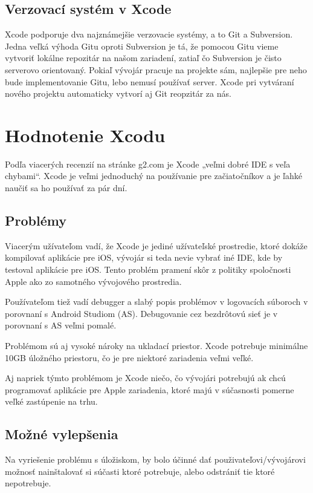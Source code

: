 \documentclass[12pt]{article}
\begin{document}
		\subsection{Verzovací systém v Xcode}
			Xcode podporuje dva najznámejšie verzovacie systémy,  a to Git a Subversion.  Jedna veľká výhoda Gitu oproti Subversion je tá,  že pomocou Gitu vieme vytvoriť lokálne repozitár na našom zariadení,  zatiaľ čo Subversion je čisto serverovo orientovaný.  Pokiaľ vývojár pracuje na projekte sám,  najlepšie pre neho bude implementovanie Gitu,  lebo nemusí používať server.  Xcode pri vytváraní nového projektu automaticky vytvorí aj Git reopzitár za nás.  \cite{xcodevcs} \par

	\newpage
		\section{Hodnotenie Xcodu}
			Podľa viacerých recenzií na stránke g2.com \cite{g2xreviews} je Xcode „veľmi dobré IDE s veľa chybami“.  Xcode je veľmi jednoduchý na používanie pre začiatočníkov a je ľahké naučiť sa ho používať za pár dní.

		\subsection{Problémy}
			Viacerým užívateľom vadí,  že Xcode je jediné užívateľské prostredie,  ktoré dokáže kompilovať aplikácie pre iOS,  vývojár si teda nevie vybrať iné IDE,  kde by testoval aplikácie pre iOS.  Tento problém pramení skôr z politiky spoločnosti Apple ako zo samotného vývojového prostredia.  \par
			Používateľom tiež vadí debugger a slabý popis problémov v logovacích súboroch v porovnaní s Android Studiom (AS).  Debugovanie cez bezdrôtovú sieť je v porovnaní s AS veľmi pomalé.  \par
			Problémom sú aj vysoké nároky na ukladací priestor.  Xcode potrebuje minimálne 10GB úložného priestoru,  čo je pre niektoré zariadenia veľmi veľké.  \par
			Aj napriek týmto problémom je Xcode niečo,  čo vývojári potrebujú ak chcú programovať aplikácie pre Apple zariadenia,  ktoré majú v súčasnosti pomerne veľké zastúpenie na trhu.

		\subsection{Možné vylepšenia}
			Na vyriešenie problému s úložiskom,  by bolo účinné dať použivateľovi/vývojárovi možnosť nainštalovať si súčasti ktoré potrebuje,  alebo odstrániť tie ktoré nepotrebuje.
\end{document}
